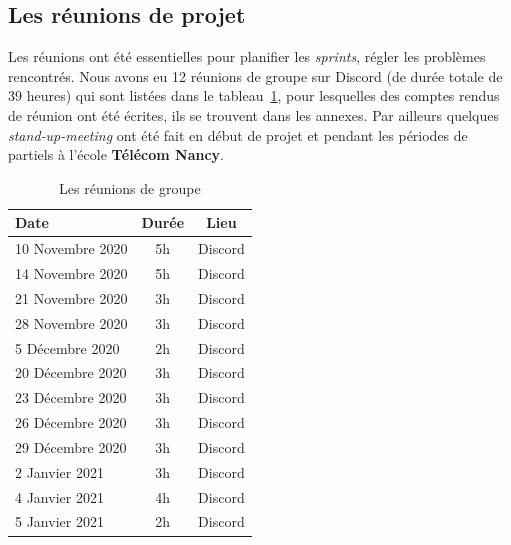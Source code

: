 \documentclass[12pt]{article}
\begin{document}
\subsection{Les réunions de projet}
Les réunions ont été essentielles pour planifier les \textsl{sprints}, régler les problèmes rencontrés. Nous avons eu 12 réunions de groupe sur \textsf{Discord} (de durée totale de 39 heures) qui sont listées dans le tableau~\ref{tab:reunions}, pour lesquelles des comptes rendus de réunion ont été écrites, ils se trouvent dans les annexes. Par ailleurs quelques \textsl{stand-up-meeting} ont été fait en début de projet et pendant les périodes de partiels à l'école \textbf{Télécom Nancy}.
\begin{table}[!h]
\begin{center}
    \begin{tabular}{|l|c|c|}
    \hline
        Date & Durée & Lieu\\
    \hline
    \hline
        10 Novembre 2020 & 5h & Discord \\
    \hline
        14 Novembre 2020 & 5h & Discord \\
    \hline
        21 Novembre 2020 & 3h & Discord \\
    \hline
        28 Novembre 2020 & 3h & Discord \\
    \hline
        5 Décembre 2020 & 2h & Discord \\
    \hline
        20 Décembre 2020 & 3h & Discord \\
    \hline
        23 Décembre 2020 & 3h & Discord \\
    \hline
        26 Décembre 2020 & 3h & Discord \\
    \hline
        29 Décembre 2020 & 3h & Discord \\
    \hline
        2 Janvier 2021 & 3h & Discord \\
    \hline
        4 Janvier 2021 & 4h & Discord \\
    \hline
        5 Janvier 2021 & 2h & Discord \\
    \hline
    \end{tabular}
\end{center}
\caption{Les réunions de groupe}
\label{tab:reunions}
\end{table}

\newpage
\end{document}
